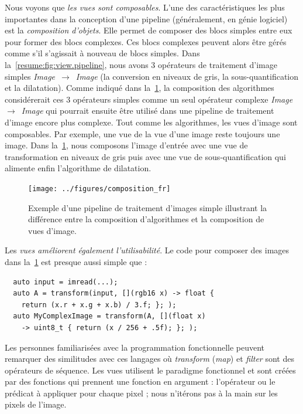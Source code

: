 Nous voyons que \emph{les vues sont composables}. L'une des caractéristiques les plus importantes dans la conception
d'une pipeline (généralement, en génie logiciel) est la \emph{composition d'objets}. Elle permet de composer des blocs
simples entre eux pour former des blocs complexes. Ces blocs complexes peuvent alors être gérés comme s'il s'agissait à
nouveau de blocs simples. Dans la~\cref{resume:fig:view.pipeline}, nous avons 3 opérateurs de traitement d'image simples
\emph{Image}~\(\rightarrow\)~\emph{Image} (la conversion en niveaux de gris, la sous-quantification et la dilatation).
Comme indiqué dans la~\cref{resume:fig:view.comp}, la composition des algorithmes considérerait ces 3 opérateurs simples
comme un seul opérateur complexe \emph{Image}~\(\rightarrow\)~\emph{Image} qui pourrait ensuite être utilisé dans une
pipeline de traitement d'image encore plus complexe. Tout comme les algorithmes, les vues d'image sont composables. Par
exemple, une vue de la vue d'une image reste toujours une image. Dans la~\cref{resume:fig:view.comp}, nous composons
l'image d'entrée avec une vue de transformation en niveaux de gris puis avec une vue de sous-quantification qui alimente
enfin l'algorithme de dilatation.

\begin{figure}[htbp]
  \centering
  \texttt{[image: ../figures/composition\_fr]}
  \caption[]{Exemple d'une pipeline de traitement d'images simple illustrant la différence entre la composition
    d'algorithmes et la composition de vues d'image.}
  \label{resume:fig:view.comp}
\end{figure}

Les \emph{vues améliorent également l'utilisabilité}. Le code pour composer des images dans
la~\cref{resume:fig:view.comp} est presque aussi simple que :

\begin{verbatim}
  auto input = imread(...);
  auto A = transform(input, [](rgb16 x) -> float {
    return (x.r + x.g + x.b) / 3.f; }; );
  auto MyComplexImage = transform(A, [](float x)
    -> uint8_t { return (x / 256 + .5f); }; );
\end{verbatim}

Les personnes familiarisées avec la programmation fonctionnelle peuvent remarquer des similitudes avec ces langages où
\emph{transform} (\emph{map}) et \emph{filter} sont des opérateurs de séquence. Les vues utilisent le paradigme
fonctionnel et sont créées par des fonctions qui prennent une fonction en argument : l'opérateur ou le prédicat à
appliquer pour chaque pixel ; nous n'itérons pas à la main sur les pixels de l'image.

